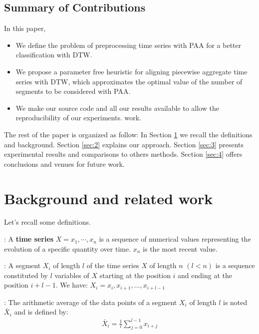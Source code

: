 \subsection{Summary of Contributions}

In this paper, 
\begin{itemize}
\item We define the problem of preprocessing time series with PAA for a better classification with
DTW.
\item We propose a parameter free heuristic for aligning piecewise aggregate time series with DTW, which approximates the optimal value of the number of segments to be considered with PAA. 
\item  We make our source code and all our results available to allow the reproducibility of
our experiments.
work.
\end{itemize}

The rest of the paper is organized as follow: In Section
\ref{sec:1} we recall the definitions and background. Section \ref{sec:2} explains our approach.
Section \ref{sec:3} presents experimental results and comparisons to others methods. Section
\ref{sec:4} offers conclusions and venues for future work.   


\section{Background and related work}
\label{sec:1}
Let's recall some definitions.

\begin{definition}:  A \textbf{time series}
$X=x_{1},\cdots,x_{n}$ is a sequence of numerical values representing the evolution of a specific quantity over time. $x_{n}$ is the most recent value.
\end{definition}

\begin{definition}:
A segment  $X_{i}$ of length  $l$ of the time series $X$ of length $n$
$(l<n)$ is a sequence constituted by $l$  variables of $X$ starting at the position $i$ and ending at the position $i+l-1$.
We have: $X_{i}=x_{i},x_{i+1},...,x_{i+l-1}$
\end{definition}

\begin{definition}:
The arithmetic average of the data points of a segment  $X_{i}$ of length
$l$ is noted $\bar{X}_{i}$ and is defined by:
\begin{eqnarray}
\bar{X}_{i}=\frac{1}{l}\sum_{j=0}^{l-1}x_{i+j}
\end{eqnarray}

\end{definition}

